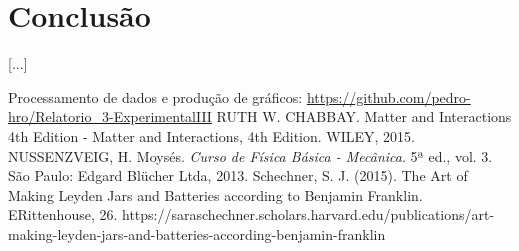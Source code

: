 \documentclass[column,brazilian,12pt,a4paper,final]{article}
\begin{document}
\section{Conclusão}
[...]

\begin{thebibliography}{99}

\bibitem{}
Processamento de dados e produção de gráficos:
\url{https://github.com/pedro-hro/Relatorio_3-ExperimentalIII}
\bibitem{}
RUTH W. CHABBAY. Matter and Interactions 4th Edition - Matter and Interactions, 4th Edition. WILEY, 2015.
\bibitem{}
NUSSENZVEIG, H. Moysés. {\em Curso de Física Básica - Mecânica}. 5ª ed., vol. 3. São Paulo: Edgard Blücher Ltda, 2013.
\bibitem{}
Schechner, S. J. (2015). The Art of Making Leyden Jars and Batteries according to Benjamin Franklin. ERittenhouse, 26. https://saraschechner.scholars.harvard.edu/publications/art-making-leyden-jars-and-batteries-according-benjamin-franklin


\end{thebibliography}


\end{document}
